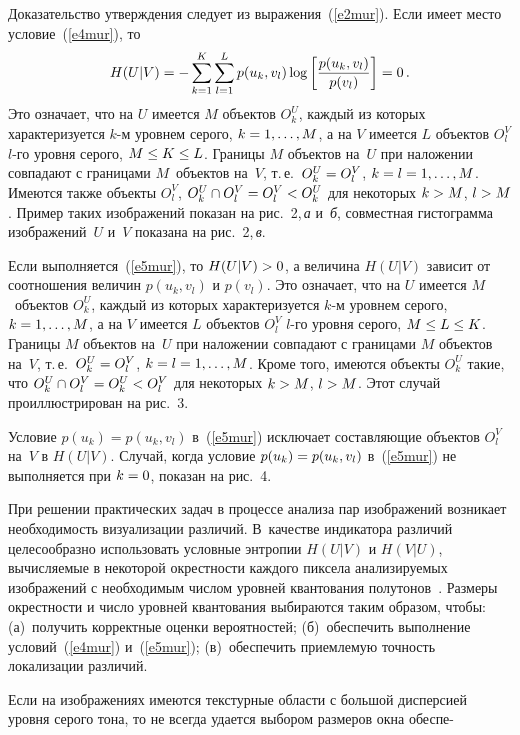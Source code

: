 \begin{multicols}{2}
  
  \smallskip
  
  Доказательство утверждения следует из выражения~(\ref{e2mur}). Если имеет место 
условие~(\ref{e4mur}), то 
  \begin{equation*}
  H(U\vert V) = -\sum\limits_{k=1}^K \sum\limits_{l=1}^L p(u_k,v_l)\log \left[ 
\displaystyle\frac{\displaystyle p(u_k,v_l)\mathstrut}{\displaystyle p(v_l)\mathstrut}\right] =0\,.
  \end{equation*}
    Это означает, что на $U$ имеется $M$ объектов $O_k^U$, каждый из которых 
характеризуется $k$-м уровнем серого, $k\hm = 1, \ldots , M$, а на $V$ имеется $L$ объектов 
$O_l^V$ $l$-го уровня серого, $M\hm\leq K\hm\leq L$. Границы $M$ объектов на~$U$ при 
наложении совпадают с границами $M$~объектов на~$V$, т.\,е.\ $O_k^U\hm=O_l^V$, $k\hm 
=l\hm= 1, \ldots , M$. Имеются также объекты $O_l^V$, $O_k^U\cap 
O_l^V\hm=O_l^V\hm<O_k^U$ для некоторых $k\hm>M$, $l\hm>M$. Пример таких 
изображений показан на рис.~2,\,\textit{а} и~\textit{б}, совместная гистограмма 
изображений~$U$ и~$V$ показана на рис.~2,\,\textit{в}.
  

      
  Если выполняется~(\ref{e5mur}), то $H(U\vert V)\hm>0$, а величина $H(U\vert V)$ зависит 
от соотношения величин $p(u_k,v_l)$ и $p(v_l)$. Это означает, что на $U$ имеется 
$M$~объектов $O_k^U$, каждый из которых характеризуется $k$-м уровнем серого, $k\hm = 
1, \ldots , M$, а на $V$ имеется $L$ объектов $O_l^V$ $l$-го уровня серого, $M\hm\leq 
L\hm\leq K$. Границы $M$ объектов на~$U$ при наложении совпадают с границами $M$ 
объектов на~$V$, т.\,е.\ $O_k^U\hm=O_l^V$, $k\hm = l \hm= 1, \ldots , M$. Кроме того, 
имеются объекты $O_k^U$ такие, что $O_k^U\cap O_l^V\hm= O_k^U\hm<O_l^V$ для 
некоторых $k\hm>M$, $l\hm>M$. Этот случай проиллюстрирован на рис.~3.


  
  Условие $p(u_k) =p(u_k,v_l)$ в~(\ref{e5mur}) исключает со\-став\-ля\-ющие объектов $O_l^V$ 
на~$V$ в $H(U\vert V)$. Случай, когда условие $p(u_k)\hm=p(u_k,v_l)$ в~(\ref{e5mur}) не 
выполняется при $k\hm = 0$, показан на рис.~4.
  
  При решении практических задач в процессе анализа пар изображений возникает 
необходимость визуализации различий. В~качестве индикатора\linebreak
 различий целесообразно 
использовать условные энтропии $H(U\vert V)$ и $H(V\vert U)$, вычисляемые в некоторой 
окрестности каждого пиксела ана\-ли\-зи\-ру\-емых изображений с необходимым числом уровней 
квантования полутонов~\cite{15mur}. Размеры окрестности и число уровней квантования 
выбираются таким образом, чтобы: (а)~получить корректные оценки вероятностей; 
(б)~обеспечить выполнение условий~(\ref{e4mur}) и~(\ref{e5mur}); (в)~обеспечить 
приемлемую точность локализации различий.



  
  Если на изображениях имеются текстурные об\-ласти с большой дисперсией уровня серого 
тона, то не всегда удается выбором размеров окна обеспе-\linebreak\vspace*{-12pt}
\pagebreak

\end{multicols}

